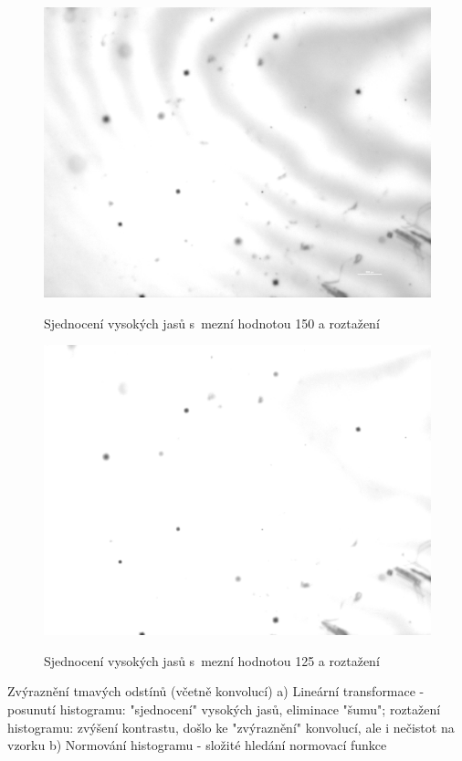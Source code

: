 \documentclass[12pt, a4paper]{report}
\begin{document}
	\begin{figure}[!htb]
	\centering
	\includegraphics[scale=0.1]{obrazky/roztazeni_jasu_0_150.png}
	\label{fig:jas_0_150}
	\caption{Sjednocení vysokých jasů s~mezní hodnotou 150 a roztažení}
	\end{figure}
	
	\begin{figure}[!htb]
	\centering
	\includegraphics[scale=0.1]{obrazky/roztazeni_jasu_0_125.png}
	\label{fig:jas_0_125}
	\caption{Sjednocení vysokých jasů s~mezní hodnotou 125 a roztažení}
	\end{figure}				
	
	Zvýraznění tmavých odstínů (včetně konvolucí) 
		a) Lineární transformace - posunutí histogramu: "sjednocení" vysokých jasů, eliminace "šumu"; roztažení histogramu: zvýšení kontrastu, došlo ke "zvýraznění" konvolucí, ale i nečistot na vzorku 
		b) Normování histogramu - složité hledání normovací funkce
		
\end{document}
